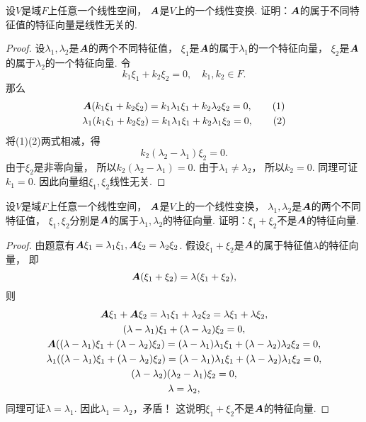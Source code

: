 \begin{example}
设\(V\)是域\(F\)上任意一个线性空间，
\(\boldsymbol{A}\)是\(V\)上的一个线性变换.
证明：\(\boldsymbol{A}\)的属于不同特征值的特征向量是线性无关的.
\begin{proof}
设\(\lambda_1,\lambda_2\)是\(\boldsymbol{A}\)的两个不同特征值，
\(\xi_1\)是\(\boldsymbol{A}\)的属于\(\lambda_1\)的一个特征向量，
\(\xi_2\)是\(\boldsymbol{A}\)的属于\(\lambda_2\)的一个特征向量.
令\[
	k_1 \xi_1 + k_2 \xi_2 = 0,
	\quad k_1,k_2 \in F.
\]
那么\begin{gather*}
	\vb{A}(k_1 \xi_1 + k_2 \xi_2)
	= k_1 \lambda_1 \xi_1 + k_2 \lambda_2 \xi_2
	= 0, \tag1 \\
	\lambda_1(k_1 \xi_1 + k_2 \xi_2)
	= k_1 \lambda_1 \xi_1 + k_2 \lambda_1 \xi_2
	= 0, \tag2
\end{gather*}
将(1)(2)两式相减，得\[
	k_2 (\lambda_2 - \lambda_1) \xi_2 = 0.
\]
由于\(\xi_2\)是非零向量，
所以\(k_2 (\lambda_2 - \lambda_1) = 0\).
由于\(\lambda_1 \neq \lambda_2\)，
所以\(k_2 = 0\).
同理可证\(k_1 = 0\).
因此向量组\(\xi_1,\xi_2\)线性无关.
\end{proof}
\end{example}

\begin{example}
设\(V\)是域\(F\)上任意一个线性空间，
\(\boldsymbol{A}\)是\(V\)上的一个线性变换，
\(\lambda_1,\lambda_2\)是\(\boldsymbol{A}\)的两个不同特征值，
\(\xi_1,\xi_2\)分别是\(\boldsymbol{A}\)的属于\(\lambda_1,\lambda_2\)的特征向量.
证明：\(\xi_1+\xi_2\)不是\(\boldsymbol{A}\)的特征向量.
\begin{proof}
由题意有\(\boldsymbol{A} \xi_1 = \lambda_1 \xi_1,
\boldsymbol{A} \xi_2 = \lambda_2 \xi_2\).
假设\(\xi_1+\xi_2\)是\(\boldsymbol{A}\)的属于特征值\(\lambda\)的特征向量，
即\[
	\boldsymbol{A} (\xi_1 + \xi_2) = \lambda (\xi_1 + \xi_2),
\]
则\begin{gather*}
	\boldsymbol{A} \xi_1 + \boldsymbol{A} \xi_2
	= \lambda_1 \xi_1 + \lambda_2 \xi_2
	= \lambda \xi_1 + \lambda \xi_2, \\
	(\lambda - \lambda_1) \xi_1 + (\lambda - \lambda_2) \xi_2
	= 0, \\
	\boldsymbol{A}((\lambda - \lambda_1) \xi_1 + (\lambda - \lambda_2) \xi_2)
	= (\lambda - \lambda_1) \lambda_1 \xi_1 + (\lambda - \lambda_2) \lambda_2 \xi_2
	= 0, \\
	\lambda_1((\lambda - \lambda_1) \xi_1 + (\lambda - \lambda_2) \xi_2)
	= (\lambda - \lambda_1) \lambda_1 \xi_1 + (\lambda - \lambda_2) \lambda_1 \xi_2
	= 0, \\
	(\lambda - \lambda_2) (\lambda_2 - \lambda_1) \xi_2 = 0, \\
	\lambda = \lambda_2,
\end{gather*}
同理可证\(\lambda = \lambda_1\).
因此\(\lambda_1 = \lambda_2\)，矛盾！
这说明\(\xi_1+\xi_2\)不是\(\boldsymbol{A}\)的特征向量.
\end{proof}
\end{example}

